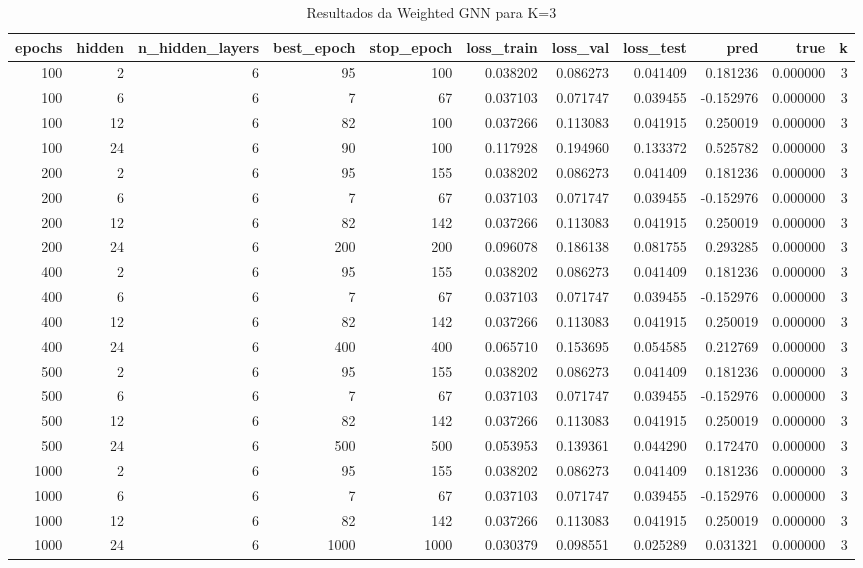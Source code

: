 \begin{table}
\caption{Resultados da Weighted GNN para K=3}
\label{tab:weighted_gnn_results_k3}
\begin{tabular}{rrrrrrrrrrr}
\toprule
epochs & hidden & n\_hidden\_layers & best\_epoch & stop\_epoch & loss\_train & loss\_val & loss\_test & pred & true & k \\
\midrule
100 & 2 & 6 & 95 & 100 & 0.038202 & 0.086273 & 0.041409 & 0.181236 & 0.000000 & 3 \\
100 & 6 & 6 & 7 & 67 & 0.037103 & 0.071747 & 0.039455 & -0.152976 & 0.000000 & 3 \\
100 & 12 & 6 & 82 & 100 & 0.037266 & 0.113083 & 0.041915 & 0.250019 & 0.000000 & 3 \\
100 & 24 & 6 & 90 & 100 & 0.117928 & 0.194960 & 0.133372 & 0.525782 & 0.000000 & 3 \\
200 & 2 & 6 & 95 & 155 & 0.038202 & 0.086273 & 0.041409 & 0.181236 & 0.000000 & 3 \\
200 & 6 & 6 & 7 & 67 & 0.037103 & 0.071747 & 0.039455 & -0.152976 & 0.000000 & 3 \\
200 & 12 & 6 & 82 & 142 & 0.037266 & 0.113083 & 0.041915 & 0.250019 & 0.000000 & 3 \\
200 & 24 & 6 & 200 & 200 & 0.096078 & 0.186138 & 0.081755 & 0.293285 & 0.000000 & 3 \\
400 & 2 & 6 & 95 & 155 & 0.038202 & 0.086273 & 0.041409 & 0.181236 & 0.000000 & 3 \\
400 & 6 & 6 & 7 & 67 & 0.037103 & 0.071747 & 0.039455 & -0.152976 & 0.000000 & 3 \\
400 & 12 & 6 & 82 & 142 & 0.037266 & 0.113083 & 0.041915 & 0.250019 & 0.000000 & 3 \\
400 & 24 & 6 & 400 & 400 & 0.065710 & 0.153695 & 0.054585 & 0.212769 & 0.000000 & 3 \\
500 & 2 & 6 & 95 & 155 & 0.038202 & 0.086273 & 0.041409 & 0.181236 & 0.000000 & 3 \\
500 & 6 & 6 & 7 & 67 & 0.037103 & 0.071747 & 0.039455 & -0.152976 & 0.000000 & 3 \\
500 & 12 & 6 & 82 & 142 & 0.037266 & 0.113083 & 0.041915 & 0.250019 & 0.000000 & 3 \\
500 & 24 & 6 & 500 & 500 & 0.053953 & 0.139361 & 0.044290 & 0.172470 & 0.000000 & 3 \\
1000 & 2 & 6 & 95 & 155 & 0.038202 & 0.086273 & 0.041409 & 0.181236 & 0.000000 & 3 \\
1000 & 6 & 6 & 7 & 67 & 0.037103 & 0.071747 & 0.039455 & -0.152976 & 0.000000 & 3 \\
1000 & 12 & 6 & 82 & 142 & 0.037266 & 0.113083 & 0.041915 & 0.250019 & 0.000000 & 3 \\
1000 & 24 & 6 & 1000 & 1000 & 0.030379 & 0.098551 & 0.025289 & 0.031321 & 0.000000 & 3 \\
\bottomrule
\end{tabular}
\end{table}
